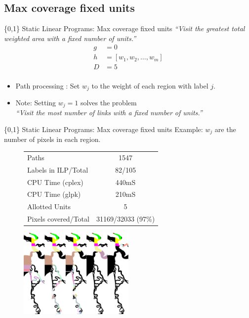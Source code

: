\documentclass[xcolor=pdflatex,dvipsnames,table]{beamer}
\begin{document}
\subsection{Max coverage fixed units}
\begin{frame}{\{0,1\} Static Linear Programs: Max coverage fixed units}
\emph{``Visit the greatest total weighted area with a fixed number of units.''}
\begin{align*}
g &= 0\\
h &= \left[ w_1,w_2, \dots ,w_m\right]\\
D &= 5\\
\end{align*}

\begin{itemize}
 \item Path processing : Set $w_j$ to the weight of each region with label $j$.
 \item Note: Setting $w_j=1$ solves the problem\\ \emph{``Visit the most number of links with a fixed number of units.''}
\end{itemize}
\end{frame}

\begin{frame}{\{0,1\} Static Linear Programs: Max coverage fixed units}
Example: $w_j$ are the number of pixels in each region.
\begin{figure}
  \begin{tabular}{|l|c|}
  \hline 
  Paths & 1547 \\
  Labels in ILP/Total & 82/105 \\
  CPU Time (cplex) & 440mS\\
  CPU Time (glpk) & 210mS \\
  Allotted Units & 5\\
  Pixels covered/Total & 31169/32033 (97\%)\\
  \hline
  \end{tabular}
\end{figure}

  \begin{figure}
     {\includegraphics[width=0.5\textwidth]{figures/max_coverage_fixed_units_paths.png}}
  \end{figure}
\end{frame}
\end{document}
